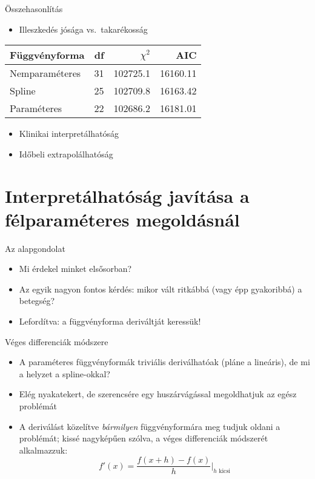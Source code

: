 \documentclass[ignorenonframetext,]{beamer}
\providecommand{\tightlist}{%
\setlength{\itemsep}{0pt}\setlength{\parskip}{0pt}}
\begin{document}
\begin{frame}{Összehasonlítás}

\begin{itemize}
\tightlist
\item
  Illeszkedés jósága vs.~takarékosság
\end{itemize}

\begin{longtable}[]{@{}lrrr@{}}
\toprule
Függvényforma & df & \(\chi^2\) & AIC\tabularnewline
\midrule
\endhead
Nemparaméteres & 31 & 102725.1 & 16160.11\tabularnewline
Spline & 25 & 102709.8 & 16163.42\tabularnewline
Paraméteres & 22 & 102686.2 & 16181.01\tabularnewline
\bottomrule
\end{longtable}

\begin{itemize}
\tightlist
\item
  Klinikai interpretálhatóság
\item
  Időbeli extrapolálhatóság
\end{itemize}

\end{frame}

\section{Interpretálhatóság javítása a félparaméteres
megoldásnál}\label{interpretalhatosag-javitasa-a-felparameteres-megoldasnal}

\begin{frame}{Az alapgondolat}

\begin{itemize}
\tightlist
\item
  Mi érdekel minket elsősorban?
\item
  Az egyik nagyon fontos kérdés: mikor vált ritkábbá (vagy épp
  gyakoribbá) a betegség?
\item
  Lefordítva: a függvényforma deriváltját keressük!
\end{itemize}

\end{frame}

\begin{frame}{Véges differenciák módszere}

\begin{itemize}
\tightlist
\item
  A paraméteres függvényformák triviális deriválhatóak (pláne a
  lineáris), de mi a helyzet a spline-okkal?
\item
  Elég nyakatekert, de szerencsére egy huszárvágással megoldhatjuk az
  egész problémát
\item
  A deriválást közelítve \emph{bármilyen} függvényformára meg tudjuk
  oldani a problémát; kissé nagyképűen szólva, a véges differenciák
  módszerét alkalmazzuk: \[
  f'\left(x\right)=\frac{f\left(x+h\right)-f\left(x\right)}{h}\Bigg\rvert_{h \textrm{ kicsi}}
  \]
\end{itemize}

\end{frame}
\end{document}
